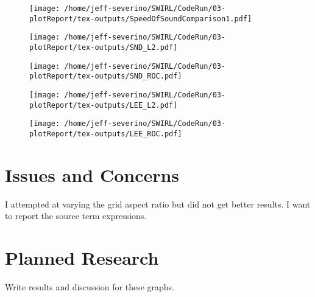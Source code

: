 \documentclass[a4paper]{article}
\begin{document}
\begin{figure}[!]
    \centering
    \texttt{[image: /home/jeff-severino/SWIRL/CodeRun/03-plotReport/tex-outputs/SpeedOfSoundComparison1.pdf]}
    \caption{}
    \label{fig:2}
\end{figure}


\begin{figure}[!]
    \centering
    \texttt{[image: /home/jeff-severino/SWIRL/CodeRun/03-plotReport/tex-outputs/SND\_L2.pdf]}
    \caption{}
    \label{fig:4}
\end{figure}


\begin{figure}[!]
    \centering
    \texttt{[image: /home/jeff-severino/SWIRL/CodeRun/03-plotReport/tex-outputs/SND\_ROC.pdf]}
    \caption{}
    \label{fig:5}
\end{figure}


\begin{figure}[!]
    \centering
    \texttt{[image: /home/jeff-severino/SWIRL/CodeRun/03-plotReport/tex-outputs/LEE\_L2.pdf]}
    \caption{}
    \label{fig:6}
\end{figure}


\begin{figure}[!]
    \centering
        \texttt{[image: /home/jeff-severino/SWIRL/CodeRun/03-plotReport/tex-outputs/LEE\_ROC.pdf]}
        \caption{}
        \label{fig:7}
\end{figure}





\section{Issues and Concerns}
I attempted at varying the grid aspect ratio but did not get better results.
I want to report the source term expressions.
\section{Planned Research}
Write results and discussion for these graphs.
\end{document}
